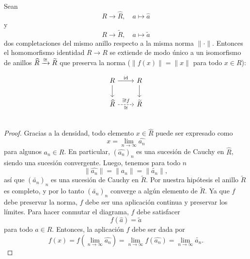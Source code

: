 \documentclass{article}
\numberwithin{equation}{section}
\theoremstyle{definition}
\begin{document}
\begin{lema}
  Sean
  $$R \to \widehat{R}, \quad a \mapsto \widehat{a}$$
  y
  $$R \to \widetilde{R}, \quad a \mapsto \widetilde{a}$$
  dos completaciones del mismo anillo respecto a la misma norma
  $\|\cdot\|$. Entonces el homomorfismo identidad $R\to R$ se extiende
  de modo único a un isomorfismo de anillos
  $\widehat{R} \xrightarrow{\cong} \widetilde{R}$ que preserva la norma
  ($\|f (x)\| = \|x\|$ para todo $x\in R$):

  \[ \begin{tikzcd}
      R\ar{d}\ar[=]{r}{\idid} & R\ar{d} \\
      \widehat{R}\ar[dashed]{r}{\exists ! f}[swap]{\isom} & \widetilde{R} \\
    \end{tikzcd} \]

  \begin{proof}
    Gracias a la densidad, todo elemento $x\in\widehat{R}$ puede ser expresado
    como
    \begin{equation}
      \label{eqn:expresion-de-x-por-densidad}
      x = \lim_{n\to\infty} \widehat{a_n}
    \end{equation}
    para algunos $a_n\in R$. En particular, $(\widehat{a_n})_n$ es una sucesión
    de Cauchy en $\widehat{R}$, siendo una sucesión convergente. Luego, tenemos
    para todo $n$
    $$\|\widehat{a_n}\| = \|a_n\| = \|\widetilde{a_n}\|,$$
    así que $(\widetilde{a_n})_n$ es una sucesión de Cauchy
    en $\widetilde{R}$. Por nuestra hipótesis el anillo $\widetilde{R}$
    es completo, y por lo tanto $(\widetilde{a_n})_n$ converge a algún elemento
    de $\widetilde{R}$. Ya que $f$ debe preservar la norma, $f$ debe ser
    una aplicación continua y preservar los límites. Para hacer conmutar
    el diagrama, $f$ debe satisfacer
    $$f (\widehat{a}) = \widetilde{a}$$
    para todo $a\in R$. Entonces, la aplicación $f$ debe ser dada por
    \begin{equation}
      \label{eqn:unica-posible-formula-para-f}
      f (x) = f \left(\lim_{n\to\infty} \widehat{a_n}\right)
            = \lim_{n\to\infty} f (\widehat{a_n})
            = \lim_{n\to\infty} \widetilde{a_n}.
    \end{equation}


\end{proof}
\end{lema}
\end{document}
